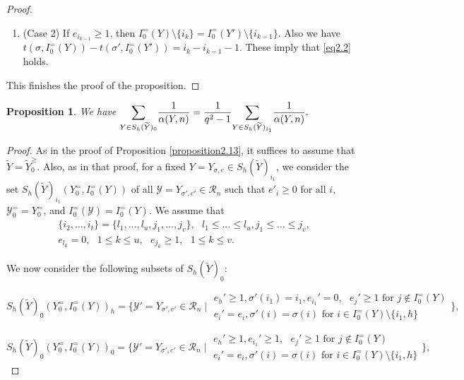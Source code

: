 \documentclass[11pt,oneside]{amsart}
\theoremstyle{plain}
\newtheorem{proposition}[theorem]{Proposition}
\theoremstyle{definition}
\theoremstyle{remark}
\newcommand{\tx}[1]{\text{#1}}
\newcommand{\CR}{{\mathcal R}}
\newcommand{\CY}{{\mathcal Y}}
\numberwithin{equation}{section}
\begin{document}
\begin{proof}
\begin{enumerate}
			\item (Case 2) If $e_{i_{k-1}} \geq 1$, then $I_0^=(Y) \setminus \lbrace i_k \rbrace=I_0^=(Y') \setminus \lbrace i_{k-1} \rbrace$. Also we have $t(\sigma,I_0^=(Y))-t(\sigma',I_0^=(Y'))=i_k-i_{k-1}-1$. These imply that \eqref{eq2.2} holds.
		\end{enumerate}
		This finishes the proof of the proposition.
	\end{proof}
	
	\begin{proposition}\label{proposition2.14} We have
		$
		\mathlarger{\sum}_{Y \in S_h(\widetilde{Y})_{0}} \dfrac{1}{\alpha(Y,n)}=\dfrac{1}{q^2-1}\mathlarger{\sum}_{Y \in S_h(\widetilde{Y})_{i_{1}}} \dfrac{1}{\alpha(Y,n)}.
		$
	\end{proposition}
	\begin{proof}
		As in the proof of Proposition \ref{proposition2.13}, it suffices to assume that $\widetilde{Y}=\widetilde{Y}_0^{\geq}$. Also, as in that proof, for a fixed $Y=Y_{\sigma,e} \in S_h(\widetilde{Y})_{i_{1}}$, we consider the set $S_h(\widetilde{Y})_{i_{1}}(Y_0^=,I_0^=(Y))$ of all $\CY=Y_{\sigma',e'} \in \CR_n$ such that $e'_i \geq 0$ for all $i$, $\CY_0^==Y_0^{=}$, and $I_0^=(\CY)=I_0^=(Y)$. We assume that
		\begin{equation*}
			\begin{array}{l}
				\lbrace i_2, \dots ,i_t \rbrace=\lbrace l_1,\dots,l_u,j_1,\dots,j_v \rbrace,\tx{ } l_1 \leq \dots \leq l_u, j_1 \leq \dots \leq j_v,\\
				e_{l_k}=0,\tx{ }1 \leq k \leq u, \tx{ } e_{j_k} \geq 1, \tx{ }1 \leq k \leq v.
			\end{array}
		\end{equation*}
		
		We now consider the following subsets of $S_h(\widetilde{Y})_{0}$:
		
		$
		S_h(\widetilde{Y})_{0}(Y_0^=,I_0^=(Y))_h=\lbrace \CY'=Y_{\sigma',e'}\in \CR_n \mid \begin{array}{l}e_h'\geq1, \sigma'(i_1)=i_1, e_{i_1}'=0,  \tx{ }e_j' \geq 1 \tx{ for }j \notin I_0^{=}(Y)\\ e_i'=e_i, \sigma'(i)=\sigma(i) \tx{ for }i \in I_0^{=}(Y)\setminus \lbrace i_1,h \rbrace\end{array} \rbrace,$
		
		$	S_h(\widetilde{Y})_{0}(Y_0^=,I_0^=(Y))_0=\lbrace \CY'=Y_{\sigma',e'}\in \CR_n \mid \begin{array}{l}e_h'\geq1, e_{i_1}'\geq 1,  \tx{ }e_j' \geq 1 \tx{ for }j \notin I_0^{=}(Y)\\ e_i'=e_i, \sigma'(i)=\sigma(i) \tx{ for }i \in I_0^{=}(Y)\setminus \lbrace i_1,h \rbrace\end{array} \rbrace,$
		

\end{proof}
\end{document}
